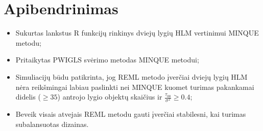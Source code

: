 \documentclass[12pt,a4paper]{article}
\begin{document}
\section{Apibendrinimas}
\begin{itemize}
\item Sukurtas lankstus R funkcijų rinkinys dviejų lygių HLM vertinimui MINQUE metodu;
\item Pritaikytas PWIGLS svėrimo metodas MINQUE metodui;
\item Simuliacijų būdu patikrinta, jog REML metodo įverčiai dviejų lygių HLM nėra reikšmingai labiau paslinkti nei MINQUE kuomet turimas pakankamai didelis ($\geq 35$) antrojo lygio objektų skaičius ir $\frac{\tau_{00}}{\sigma^2}\geq 0.4$;
\item Beveik visais atvejais REML metodu gauti įverčiai stabilesni, kai turimas subalansuotas dizainas.

\end{itemize}
\end{document}
